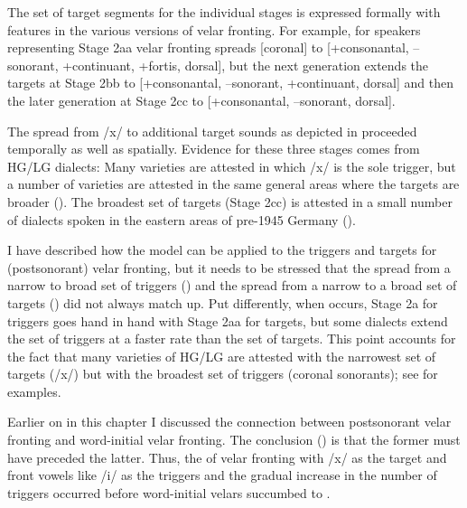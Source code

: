 The set of target segments for the individual stages is expressed formally with features in the various versions of velar fronting. For example, for speakers representing Stage 2aa velar fronting spreads [coronal] to [+consonantal, --sonorant, +continuant, +fortis, dorsal], but the next generation extends the targets at Stage 2bb to [+consonantal, --sonorant, +continuant, dorsal] and then the later generation at Stage 2cc to [+consonantal, --sonorant, dorsal].

The spread from /x/ to additional target sounds as depicted in  proceeded temporally as well as spatially. Evidence for these three stages comes from HG/LG dialects: Many varieties are attested in which /x/ is the sole trigger, but a number of varieties are attested in the same general areas where the targets are broader (). The broadest set of targets (Stage 2cc) is attested in a small number of dialects spoken in the eastern areas of pre-1945 Germany ().

I have described how the  model can be applied to the triggers and targets for (postsonorant) velar fronting, but it needs to be stressed that the spread from a narrow to broad set of triggers () and the spread from a narrow to a broad set of targets () did not always match up. Put differently, when  occurs, Stage 2a for triggers goes hand in hand with Stage 2aa for targets, but some dialects extend the set of triggers at a faster rate than the set of targets. This point accounts for the fact that many varieties of HG/LG are attested with the narrowest set of targets (/x/) but with the broadest set of triggers (coronal sonorants); see  for examples.

Earlier on in this chapter I discussed the connection between postsonorant velar fronting and word-initial velar fronting. The conclusion () is that the former must have preceded the latter. Thus, the  of velar fronting with /x/ as the target and front vowels like /i/ as the triggers and the gradual increase in the number of triggers occurred before word-initial velars succumbed to .

